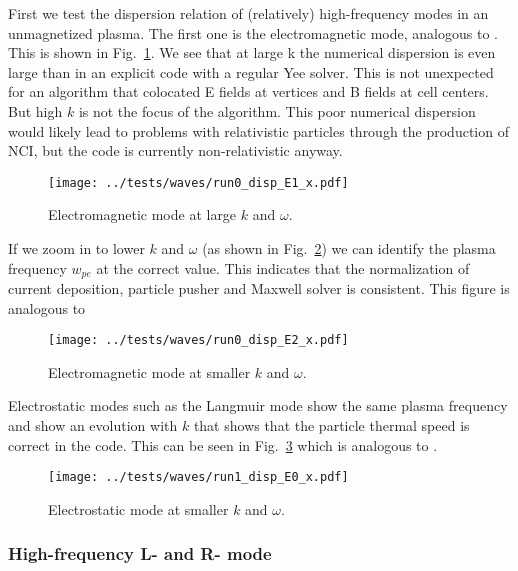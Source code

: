 \documentclass[%
preprint,
amsmath,amssymb,
aps,
]{revtex4-2}
\begin{document}
First we test the dispersion relation of (relatively) high-frequency modes in
an unmagnetized plasma. The first one is the electromagnetic mode, analogous to
\cite[Figure 3]{kilian_2017}. This is shown in Fig.~\ref{fig:waves_0B_B1}. We
see that at large k the numerical dispersion is even large than in an explicit
code with a regular Yee solver. This is not unexpected for an algorithm that
colocated E fields at vertices and B fields at cell centers. But high $k$ is
not the focus of the algorithm. This poor numerical dispersion would likely
lead to problems with relativistic particles through the production of NCI, but
the code is currently non-relativistic anyway.

\begin{figure}
    \centering
    \texttt{[image: ../tests/waves/run0\_disp\_E1\_x.pdf]}
    \caption{Electromagnetic mode at large $k$ and $\omega$.}
    \label{fig:waves_0B_B1}
\end{figure}

If we zoom in to lower $k$ and $\omega$ (as shown in
Fig.~\ref{fig:waves_0B_E1}) we can identify the plasma frequency $w_{pe}$ at
the correct value. This indicates that the normalization of current deposition,
particle pusher and Maxwell solver is consistent. This figure is analogous to
\cite[Figure 2]{kilian_2017}

\begin{figure}
    \centering
    \texttt{[image: ../tests/waves/run0\_disp\_E2\_x.pdf]}
    \caption{Electromagnetic mode at smaller $k$ and $\omega$.}
    \label{fig:waves_0B_E1}
\end{figure}

Electrostatic modes such as the Langmuir mode show the same plasma frequency
and show an evolution with $k$ that shows that the particle thermal speed is
correct in the code. This can be seen in Fig.~\ref{fig:waves_0B_E0} which is
analogous to \cite[Figure 8]{kilian_2017}.

\begin{figure}
    \centering
    \texttt{[image: ../tests/waves/run1\_disp\_E0\_x.pdf]}
    \caption{Electrostatic mode at smaller $k$ and $\omega$.}
    \label{fig:waves_0B_E0}
\end{figure}

\FloatBarrier

\subsubsection{High-frequency L- and R- mode}
\end{document}
